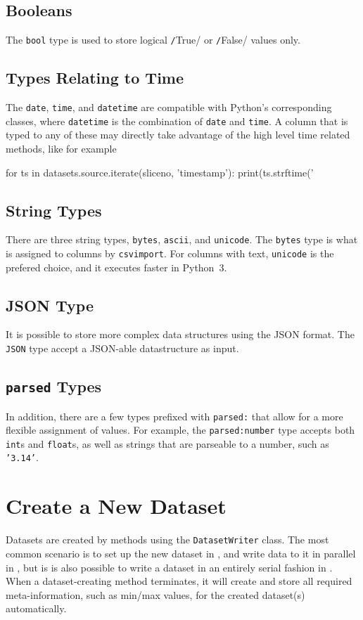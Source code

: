 \subsection{Booleans}
The \texttt{bool} type is used to store logical
\texttt/True/ or \texttt/False/ values only.


\subsection{Types Relating to Time}
The \texttt{date}, \texttt{time}, and \texttt{datetime} are compatible
with Python's corresponding classes, where \texttt{datetime} is the
combination of \texttt{date} and \texttt{time}.  A column that is
typed to any of these may directly take advantage of the high level
time related methods, like for example
\begin{python}
for ts in datasets.source.iterate(sliceno, 'timestamp'):
    print(ts.strftime('%
\end{python}


\subsection{String Types}
There are three string types, \texttt{bytes}, \texttt{ascii}, and
\texttt{unicode}.  The \texttt{bytes} type is what is assigned to
columns by \texttt{csvimport}.  For columns with text,
\texttt{unicode} is the prefered choice, and it executes faster in
Python~3.


\subsection{JSON Type}
It is possible to store more complex data structures using the JSON
format.  The \texttt{JSON} type accept a JSON-able datastructure as
input.

\subsection{\texttt{parsed} Types}
In addition, there are a few types prefixed with \texttt{parsed:} that
allow for a more flexible assignment of values.  For example,
the \texttt{parsed:number} type accepts both \texttt{int}s
and \texttt{float}s, as well as strings that are parseable to a
number, such as \texttt{'3.14'}.



\section{Create a New Dataset}
Datasets are created by methods using the \texttt{DatasetWriter}
class.  The most common scenario is to set up the new dataset in
\prepare, and write data to it in parallel in \analysis, but is is
also possible to write a dataset in an entirely serial fashion in
\synthesis.  When a dataset-creating method terminates, it will create
and store all required meta-information, such as min/max values, for
the created dataset(s) automatically.

